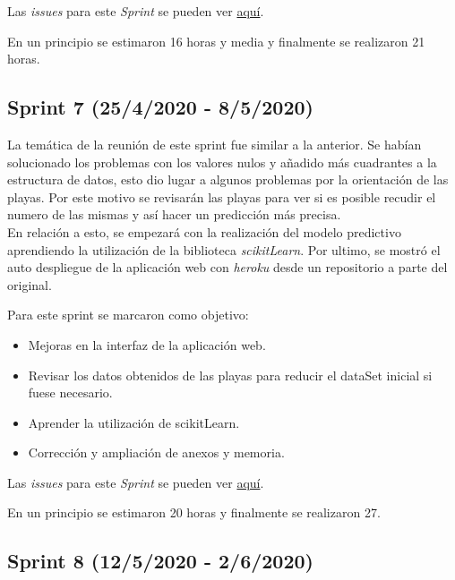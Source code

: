 Las \emph{issues} para este \emph{Sprint} se pueden ver \href{https://github.com/psnti/TFG-Pablo-Santidrian-Tudanca/milestone/6}{aquí}.


En un principio se estimaron 16 horas y media y finalmente se realizaron 21 horas.

\subsection{Sprint 7 (25/4/2020 - 8/5/2020)}\label{Sprint-7}

La temática de la reunión de este sprint fue similar a la anterior. Se habían solucionado los problemas con los valores nulos y añadido más cuadrantes a la estructura de datos, esto dio lugar a algunos problemas por la orientación de las playas. Por este motivo se revisarán las playas para ver si es posible recudir el numero de las mismas y así hacer un predicción más precisa.\\
En relación a esto, se empezará con la realización del modelo predictivo aprendiendo la utilización de la biblioteca \emph{scikitLearn}.
Por ultimo, se mostró el auto despliegue de la aplicación web con \emph{heroku} desde un repositorio a parte del original.

Para este sprint se marcaron como objetivo:
\begin{itemize}
	\item Mejoras en la interfaz de la aplicación web.
	\item Revisar los datos obtenidos de las playas para reducir el dataSet inicial si fuese necesario.
	\item Aprender la utilización de scikitLearn.
	\item Corrección y ampliación de anexos y memoria.
\end{itemize} 

Las \emph{issues} para este \emph{Sprint} se pueden ver \href{https://github.com/psnti/TFG-Pablo-Santidrian-Tudanca/milestone/7}{aquí}.


En un principio se estimaron 20 horas y finalmente se realizaron 27.

\subsection{Sprint 8 (12/5/2020 - 2/6/2020)}\label{Sprint-8}

